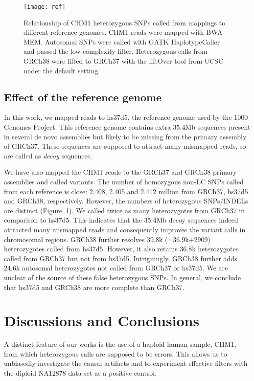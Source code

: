 \documentclass{bioinfo}
\begin{document}
\begin{figure}[!hbtp]
\centering
\texttt{[image: ref]}
\caption{Relationship of CHM1 heterozygous SNPs called from mappings to
different reference genomes. CHM1 reads were mapped with BWA-MEM. Autosomal
SNPs were called with GATK HaplotypeCaller and passed the low-complexity
filter. Heterozygous calls from GRCh38 were lifted to GRCh37 with the liftOver
tool from UCSC under the default setting.}\label{fig:ref}
\end{figure}

\subsection{Effect of the reference genome}\label{sec:ref}
In this work, we mapped reads to hs37d5, the reference genome used by the 1000
Genomes Project. This reference genome contains extra 35.4Mb sequences present
in several de novo assemblies but likely to be missing from the primary
assembly of GRCh37. These sequences are supposed to attract many mismapped
reads, so are called as \emph{decoy} sequences.

We have also mapped the CHM1 reads to the GRCh37 and GRCh38 primary assemblies
and called variants. The number of homozygous non-LC SNPs called from each
reference is close: 2.408, 2.405 and 2.412 million from GRCh37, hs37d5 and
GRCh38, respectively. However, the numbers of heterozygous SNPs/INDELs are
distinct (Figure~\ref{fig:ref}).  We called twice as many heterozygotes from
GRCh37 in comparison to hs37d5.  This indicates that the 35.4Mb decoy sequences
indeed attracted many mismapped reads and consequently improves the variant
calls in chromosomal regions.  GRCh38 further resolves 39.8k (=36.9k+2909)
heterozygotes called from hs37d5.  However, it also retains 36.8k heterozygotes
called from GRCh37 but not from hs37d5. Intriguingly, GRCh38 further adds 24.6k
autosomal heterozygotes not called from GRCh37 or hs37d5. We are unclear of the
source of these false heterozygous SNPs. In general, we conclude that hs37d5
and GRCh38 are more complete than GRCh37.

\section{Discussions and Conclusions}
A distinct feature of our works is the use of a haploid human sample, CHM1,
from which heterozygous calls are supposed to be errors. This allows us to unbiasedly
investigate the causal artifacts and to experiment effective filters with the
diploid NA12878 data set as a positive control.
\end{document}
